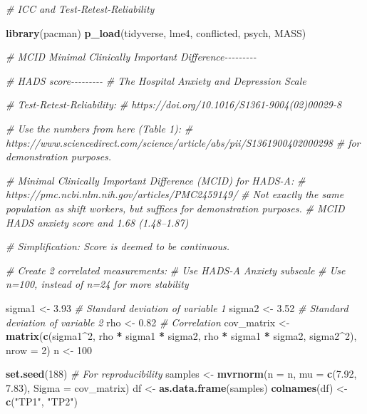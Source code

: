 \documentclass[
]{book}
\newenvironment{Shaded}{\begin{snugshade}}{\end{snugshade}}
\newcommand{\AttributeTok}[1]{\textcolor[rgb]{0.13,0.29,0.53}{#1}}
\newcommand{\CommentTok}[1]{\textcolor[rgb]{0.56,0.35,0.01}{\textit{#1}}}
\newcommand{\DecValTok}[1]{\textcolor[rgb]{0.00,0.00,0.81}{#1}}
\newcommand{\FloatTok}[1]{\textcolor[rgb]{0.00,0.00,0.81}{#1}}
\newcommand{\FunctionTok}[1]{\textcolor[rgb]{0.13,0.29,0.53}{\textbf{#1}}}
\newcommand{\NormalTok}[1]{#1}
\newcommand{\OtherTok}[1]{\textcolor[rgb]{0.56,0.35,0.01}{#1}}
\newcommand{\SpecialCharTok}[1]{\textcolor[rgb]{0.81,0.36,0.00}{\textbf{#1}}}
\newcommand{\StringTok}[1]{\textcolor[rgb]{0.31,0.60,0.02}{#1}}
\begin{document}
\begin{Shaded}
\begin{Highlighting}[]
\CommentTok{\# ICC and Test{-}Retest{-}Reliability}

\FunctionTok{library}\NormalTok{(pacman)}
\FunctionTok{p\_load}\NormalTok{(tidyverse, lme4, conflicted, psych, MASS)}

\CommentTok{\# MCID Minimal Clinically Important Difference{-}{-}{-}{-}{-}{-}{-}{-}{-}}

\CommentTok{\# HADS score{-}{-}{-}{-}{-}{-}{-}{-}{-}}
\CommentTok{\# The Hospital Anxiety and Depression Scale }

\CommentTok{\# Test{-}Retest{-}Reliability:}
\CommentTok{\# https://doi.org/10.1016/S1361{-}9004(02)00029{-}8}

\CommentTok{\# Use the numbers from here (Table 1):}
\CommentTok{\# https://www.sciencedirect.com/science/article/abs/pii/S1361900402000298}
\CommentTok{\# for demonstration purposes.}

\CommentTok{\# Minimal Clinically Important Difference (MCID) for HADS{-}A:}
\CommentTok{\# https://pmc.ncbi.nlm.nih.gov/articles/PMC2459149/}
\CommentTok{\# Not exactly the same population as shift workers, but suffices for demonstration purposes.}
\CommentTok{\# MCID HADS anxiety score and 1.68 (1.48–1.87)}

\CommentTok{\# Simplification: Score is deemed to be continuous.}

\CommentTok{\# Create 2 correlated measurements:}
\CommentTok{\# Use HADS{-}A Anxiety subscale}
\CommentTok{\# Use n=100, instead of n=24 for more stability}

\NormalTok{sigma1 }\OtherTok{\textless{}{-}} \FloatTok{3.93}  \CommentTok{\# Standard deviation of variable 1}
\NormalTok{sigma2 }\OtherTok{\textless{}{-}} \FloatTok{3.52}  \CommentTok{\# Standard deviation of variable 2}
\NormalTok{rho }\OtherTok{\textless{}{-}} \FloatTok{0.82}    \CommentTok{\# Correlation}
\NormalTok{cov\_matrix }\OtherTok{\textless{}{-}} \FunctionTok{matrix}\NormalTok{(}\FunctionTok{c}\NormalTok{(sigma1}\SpecialCharTok{\^{}}\DecValTok{2}\NormalTok{, rho }\SpecialCharTok{*}\NormalTok{ sigma1 }\SpecialCharTok{*}\NormalTok{ sigma2,}
\NormalTok{                       rho }\SpecialCharTok{*}\NormalTok{ sigma1 }\SpecialCharTok{*}\NormalTok{ sigma2, sigma2}\SpecialCharTok{\^{}}\DecValTok{2}\NormalTok{), }\AttributeTok{nrow =} \DecValTok{2}\NormalTok{)}
\NormalTok{n }\OtherTok{\textless{}{-}} \DecValTok{100}

\FunctionTok{set.seed}\NormalTok{(}\DecValTok{188}\NormalTok{)  }\CommentTok{\# For reproducibility}
\NormalTok{samples }\OtherTok{\textless{}{-}} \FunctionTok{mvrnorm}\NormalTok{(}\AttributeTok{n =}\NormalTok{ n, }\AttributeTok{mu =} \FunctionTok{c}\NormalTok{(}\FloatTok{7.92}\NormalTok{, }\FloatTok{7.83}\NormalTok{), }\AttributeTok{Sigma =}\NormalTok{ cov\_matrix)}
\NormalTok{df }\OtherTok{\textless{}{-}} \FunctionTok{as.data.frame}\NormalTok{(samples)}
\FunctionTok{colnames}\NormalTok{(df) }\OtherTok{\textless{}{-}} \FunctionTok{c}\NormalTok{(}\StringTok{"TP1"}\NormalTok{, }\StringTok{"TP2"}\NormalTok{)}


\end{Highlighting}
\end{Shaded}
\end{document}
